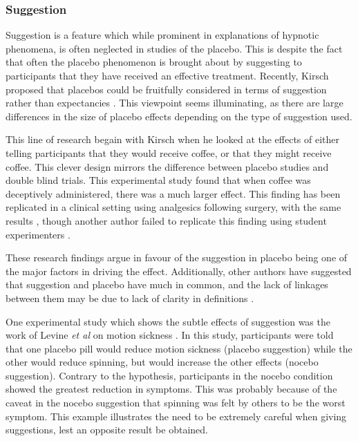 \subsubsection{Suggestion}
\label{sec:suggestion}



Suggestion is a feature which while prominent in explanations of hypnotic phenomena, is often neglected in studies of the placebo. This is despite the fact that often the placebo phenomenon is brought about by suggesting to participants that they have received an effective treatment. Recently, Kirsch proposed that  placebos could be fruitfully considered in terms of suggestion rather than expectancies  \cite{Kirsch1999}. This viewpoint seems illuminating, as there are large differences in the size of placebo effects depending on the type of suggestion used. 

This line of research begain with Kirsch \cite{kirsch1988double} when he looked at the effects of either telling participants that they would receive coffee, or that they might receive coffee. This clever design  mirrors the difference between placebo studies and double blind trials. This experimental study found that when coffee was deceptively administered, there was a much larger effect. This finding has been replicated in a clinical setting using analgesics following surgery, with the same results \cite{Amanzio2001}, though another author failed to replicate this finding using student experimenters \cite{Walach2002}. 

 These research findings argue in favour of the suggestion in placebo being one of the major factors in driving the effect. Additionally, other authors have suggested that suggestion and placebo have much in common, and the lack of linkages between them may be due to lack of clarity in definitions \cite{DePascalis2002}. 

One experimental study which shows the subtle effects of suggestion was the work of Levine \textit{et al}  on motion sickness \cite{Levine2006}.  In this study, participants were told that one placebo pill would reduce motion sickness (placebo suggestion) while the other would reduce spinning, but would increase the other effects (nocebo suggestion). Contrary to the hypothesis, participants in the nocebo condition showed the greatest reduction in symptoms. This was probably because of the caveat in the nocebo suggestion that spinning was felt by others to be the worst symptom. This example illustrates the need to be extremely careful when giving suggestions, lest an opposite result be obtained. %

